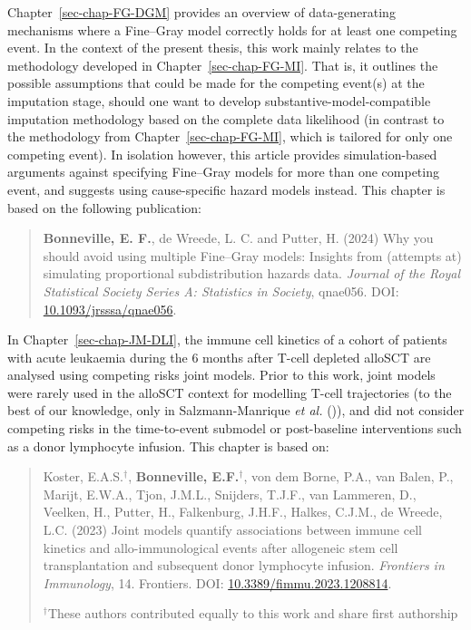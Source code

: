 \documentclass[
  letterpaper,
  paper=240mm:170mm,
  twoside=true,
  open=right,
  fontsize=10pt,
  pagesize=false,
  BCOR=15mm,
  DIV=14,
  headinclude=true,
  footinclude=false,
  headsepline=on]{scrbook}
\begin{document}
Chapter~\ref{sec-chap-FG-DGM} provides an overview of data-generating
mechanisms where a Fine--Gray model correctly holds for at least one
competing event. In the context of the present thesis, this work mainly
relates to the methodology developed in Chapter~\ref{sec-chap-FG-MI}.
That is, it outlines the possible assumptions that could be made for the
competing event(s) at the imputation stage, should one want to develop
substantive-model-compatible imputation methodology based on the
complete data likelihood (in contrast to the methodology from
Chapter~\ref{sec-chap-FG-MI}, which is tailored for only one competing
event). In isolation however, this article provides simulation-based
arguments against specifying Fine--Gray models for more than one
competing event, and suggests using cause-specific hazard models
instead. This chapter is based on the following publication:

\begin{quote}
\textbf{Bonneville, E. F.}, de Wreede, L. C. and Putter, H. (2024) Why
you should avoid using multiple Fine--Gray models: Insights from
(attempts at) simulating proportional subdistribution hazards data.
\emph{Journal of the Royal Statistical Society Series A: Statistics in
Society}, qnae056. DOI:
\href{https://doi.org/10.1093/jrsssa/qnae056}{10.1093/jrsssa/qnae056}.
\end{quote}

In Chapter~\ref{sec-chap-JM-DLI}, the immune cell kinetics of a cohort
of patients with acute leukaemia during the 6 months after T-cell
depleted alloSCT are analysed using competing risks joint models. Prior
to this work, joint models were rarely used in the alloSCT context for
modelling T-cell trajectories (to the best of our knowledge, only in
Salzmann-Manrique \emph{et al.}
()), and
did not consider competing risks in the time-to-event submodel or
post-baseline interventions such as a donor lymphocyte infusion. This
chapter is based on:

\begin{quote}
Koster, E.A.S.\(^\dagger\), \textbf{Bonneville, E.F.}\(^\dagger\), von
dem Borne, P.A., van Balen, P., Marijt, E.W.A., Tjon, J.M.L., Snijders,
T.J.F., van Lammeren, D., Veelken, H., Putter, H., Falkenburg, J.H.F.,
Halkes, C.J.M., de Wreede, L.C. (2023) Joint models quantify
associations between immune cell kinetics and allo-immunological events
after allogeneic stem cell transplantation and subsequent donor
lymphocyte infusion. \emph{Frontiers in Immunology}, 14. Frontiers. DOI:
\href{https://doi.org/10.3389/fimmu.2023.1208814}{10.3389/fimmu.2023.1208814}.

\(^\dagger\)These authors contributed equally to this work and share
first authorship
\end{quote}
\end{document}

